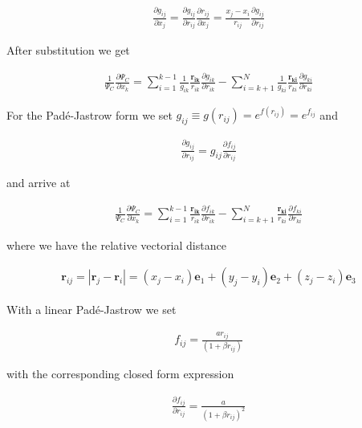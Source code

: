 \documentclass[x11names]{article}
\begin{document}
			\begin{align}
				\frac{\partial g_{ij}}{\partial x_{j}}=\frac{\partial g_{ij}}{\partial r_{ij}}\frac{\partial r_{ij}}{\partial x_{j}}=\frac{x_{j}-x_{i}}{r_{ij}}\frac{\partial g_{ij}}{\partial r_{ij}}
			\end{align}

			After substitution we get

			\begin{align}
				\frac{1}{\Psi_{C}}\frac{\partial\Psi_{C}}{\partial x_{k}}=\sum_{i=1}^{k-1}\frac{1}{g_{ik}}\frac{\mathbf{r_{ik}}}{r_{ik}}\frac{\partial g_{ik}}{\partial r_{ik}}-\sum_{i=k+1}^{N}\frac{1}{g_{ki}}\frac{\mathbf{r_{ki}}}{r_{ki}}\frac{\partial g_{ki}}{\partial r_{ki}}
			\end{align}

			For the Padé-Jastrow form we set $\ensuremath{g_{ij}\equiv g(r_{ij})=e^{f(r_{ij})}=e^{f_{ij}}}$
			and

			\begin{align}
				\frac{\partial g_{ij}}{\partial r_{ij}}=g_{ij}\frac{\partial f_{ij}}{\partial r_{ij}}
			\end{align}

			and arrive at

			\begin{align}
				\frac{1}{\Psi_{C}}\frac{\partial\Psi_{C}}{\partial x_{k}}=\sum_{i=1}^{k-1}\frac{\mathbf{r_{ik}}}{r_{ik}}\frac{\partial f_{ik}}{\partial r_{ik}}-\sum_{i=k+1}^{N}\frac{\mathbf{r_{ki}}}{r_{ki}}\frac{\partial f_{ki}}{\partial r_{ki}} \label{eq:gradient_ratio_Jastrow}
			\end{align}

			where we have the relative vectorial distance

			\begin{align}
				\mathbf{r}_{ij}=|\mathbf{r}_{j}-\mathbf{r}_{i}|=(x_{j}-x_{i})\mathbf{e}_{1}+(y_{j}-y_{i})\mathbf{e}_{2}+(z_{j}-z_{i})\mathbf{e}_{3}
			\end{align}

			With a linear Padé-Jastrow we set

			\begin{align}
				f_{ij}=\frac{ar_{ij}}{(1+\beta r_{ij})}
			\end{align}

			with the corresponding closed form expression

			\begin{align}
				\frac{\partial f_{ij}}{\partial r_{ij}}=\frac{a}{(1+\beta r_{ij})^{2}}
			\end{align}
\end{document}
